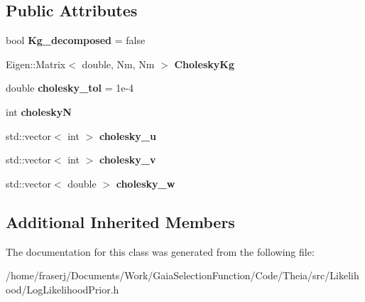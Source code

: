 \subsection*{Public Attributes}
\begin{DoxyCompactItemize}
\item 
\mbox{\label{classLogLikelihoodPrior_a26006b4353f2d1983cfd936f1969953c}} 
bool {\bfseries Kg\+\_\+decomposed} = false
\item 
\mbox{\label{classLogLikelihoodPrior_a5b64d5b52eec4a6ab6b42345c77ba7f2}} 
Eigen\+::\+Matrix$<$ double, Nm, Nm $>$ {\bfseries Cholesky\+Kg}
\item 
\mbox{\label{classLogLikelihoodPrior_ac4567245e5f7eaa048016dbb3c7ebac4}} 
double {\bfseries cholesky\+\_\+tol} = 1e-\/4
\item 
\mbox{\label{classLogLikelihoodPrior_acb82f3170dc5ef9992ca3c0b1d451e08}} 
int {\bfseries choleskyN}
\item 
\mbox{\label{classLogLikelihoodPrior_aa0413d932c2bc78bde5b6b0d69efbaa3}} 
std\+::vector$<$ int $>$ {\bfseries cholesky\+\_\+u}
\item 
\mbox{\label{classLogLikelihoodPrior_a9ee359462c406bcd3e0a851eec71ba07}} 
std\+::vector$<$ int $>$ {\bfseries cholesky\+\_\+v}
\item 
\mbox{\label{classLogLikelihoodPrior_a4af02e24015068335bd22d870b0cfb32}} 
std\+::vector$<$ double $>$ {\bfseries cholesky\+\_\+w}
\end{DoxyCompactItemize}
\subsection*{Additional Inherited Members}


The documentation for this class was generated from the following file\+:\begin{DoxyCompactItemize}
\item 
/home/fraserj/\+Documents/\+Work/\+Gaia\+Selection\+Function/\+Code/\+Theia/src/\+Likelihood/Log\+Likelihood\+Prior.\+h\end{DoxyCompactItemize}
